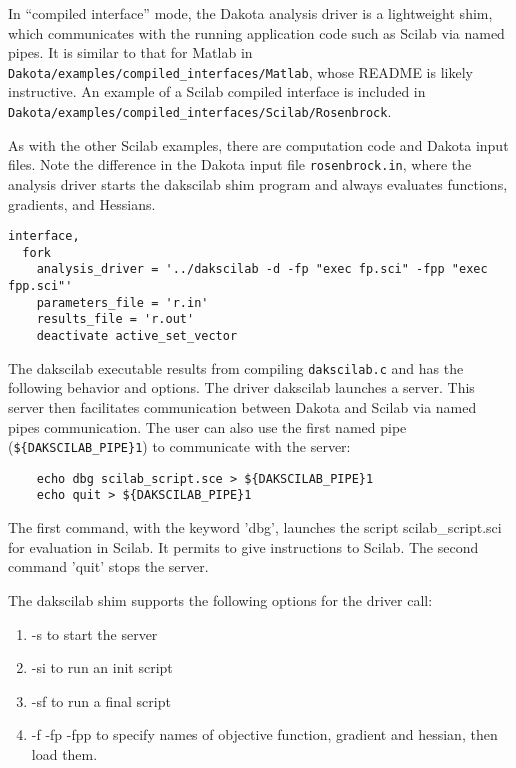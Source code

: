 In ``compiled interface'' mode, the Dakota analysis driver is a
lightweight shim, which communicates with the running application code
such as Scilab via named pipes. It is similar to that for Matlab in
\texttt{Dakota/examples/compiled\_interfaces/Matlab}, whose README is likely
instructive. An example of a Scilab compiled interface is included in \\
\texttt{Dakota/examples/compiled\_interfaces/Scilab/Rosenbrock}.

As with the other Scilab examples, there are computation code and
Dakota input files. Note the difference in the Dakota input file
\texttt{rosenbrock.in}, where the analysis driver starts the dakscilab
shim program and always evaluates functions, gradients, and Hessians.

\begin{small}
\begin{verbatim}
interface,
  fork
    analysis_driver = '../dakscilab -d -fp "exec fp.sci" -fpp "exec fpp.sci"'
    parameters_file = 'r.in'
    results_file = 'r.out'
    deactivate active_set_vector
\end{verbatim} 
\end{small}

The dakscilab executable results from compiling \texttt{dakscilab.c}
and has the following behavior and options. The driver dakscilab
launches a server. This server then facilitates communication between
Dakota and Scilab via named pipes communication. The user can also use
the first named pipe (\texttt{\$\{DAKSCILAB\_PIPE\}1}) to communicate
with the server:
\begin{small}
\begin{verbatim}
    echo dbg scilab_script.sce > ${DAKSCILAB_PIPE}1
    echo quit > ${DAKSCILAB_PIPE}1
\end{verbatim} 
\end{small}
The first command, with the keyword 'dbg', launches the script
scilab\_script.sci for evaluation in Scilab. It permits to give
instructions to Scilab. The second command 'quit' stops the server.

The dakscilab shim supports the following options for the driver call:
\begin{enumerate}
  \item -s  to start the server
  \item -si to run an init script
  \item -sf to run a final script
  \item -f -fp -fpp to specify names of objective function, gradient
    and hessian, then load them.
\end{enumerate}


